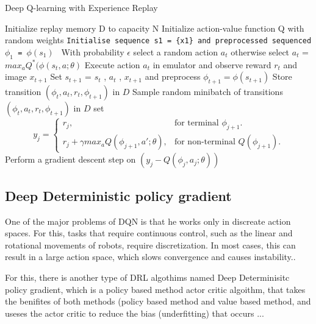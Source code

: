 \documentclass[12pt]{extarticle}
\begin{document}
\begin{algorithm}
\caption{Deep Q-learning with Experience Replay}\label{alg:cap}
\begin{algorithmic}
\State Initialize replay memory D to capacity N
\State Initialize action-value function Q with random weights
        \State \texttt{Initialise sequence s1 = \{x1\} and preprocessed sequenced $\phi_{1}$ = $\phi(s_{1})$  }
         \State With probability $\epsilon$ select a random action $a_{t}$
         \State otherwise select  $a_{t}$ = $max_{a} Q^{*}(\phi(s_{t},a;\theta) $ 
         \State Execute action $a_{t}$ in emulator and observe reward ${r_{t}}$ and image $x_{t+1}$
        \State Set $s_{t+1}$ = $s_{t}$ , $a_{t}$ , $x_{t+1}$ and preprocess  
        $\phi_{t+1}=\phi(s_{t+1})$
        \State Store transition $(\phi_{t} , a_{t} , r_{t} , \phi_{t+1} )$ in $D$
        \State Sample random
minibatch of transitions $(\phi_{t} , a_{t} , r_{t} , \phi_{t+1} )$ in $D$
        \State set  \begin{equation}
  y_{j}=\begin{cases}
    r_{j}, & \text{for terminal $\phi_{j+1} $}.\\
    r_{j}+\gamma max_{a}Q(\phi_{j+1},a';\theta) , & \text{for non-terminal $Q(\phi_{j+1})$}.
  \end{cases}
\end{equation}
        \State Perform a gradient descent step on $(y_{j} - Q(\phi_{j} , a_{j} ; \theta))$ 
        \EndFor 
\EndFor 


\end{algorithmic}
\end{algorithm}
 


\pagebreak

\subsection{Deep Deterministic policy gradient }
One of the major problems of DQN is that he works only in discreate action spaces. For this, tasks that require continuous control, such as the linear and rotational movements of robots, require discretization. In most cases, this can result in a large action space, which slows convergence and causes instability.. \cite{lillicrap2015continuous}

For this, there is another type of DRL algothims named Deep Determinisitc policy gradient, which is a policy based method actor critic algoithm, that takes the benifites of both methods (policy based method and value based method, and useses the actor critic to reduce the bias (underfitting) that occurs ...
\end{document}
